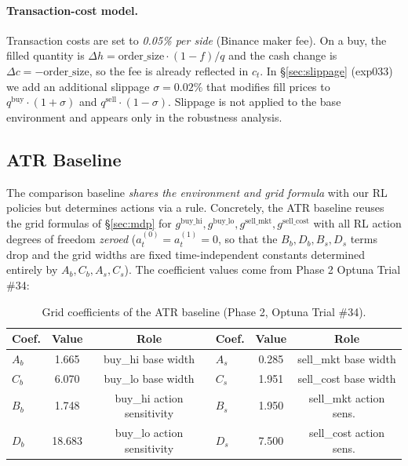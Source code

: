 \documentclass[11pt, a4paper]{article}
\begin{document}
\paragraph{Transaction-cost model.}
Transaction costs are set to \emph{0.05\% per side} (Binance maker fee). On a
buy, the filled quantity is $\Delta h = \text{order\_size} \cdot (1 - f) / q$
and the cash change is $\Delta c = -\text{order\_size}$, so the fee is already
reflected in $c_t$. In \S\ref{sec:slippage} (exp033) we add an additional
slippage $\sigma = 0.02\%$ that modifies fill prices to
$q^{\mathrm{buy}} \cdot (1 + \sigma)$ and $q^{\mathrm{sell}} \cdot (1 - \sigma)$.
Slippage is not applied to the base environment and appears only in the
robustness analysis.

\subsection{ATR Baseline}
\label{sec:atr_baseline}

The comparison baseline \emph{shares the environment and grid formula} with
our RL policies but determines actions via a rule. Concretely, the ATR
baseline reuses the grid formulas of \S\ref{sec:mdp} for $g^{\mathrm{buy\_hi}},
g^{\mathrm{buy\_lo}}, g^{\mathrm{sell\_mkt}}, g^{\mathrm{sell\_cost}}$ with all
RL action degrees of freedom \emph{zeroed} ($a_t^{(0)} = a_t^{(1)} = 0$, so
that the $B_b, D_b, B_s, D_s$ terms drop and the grid widths are fixed
time-independent constants determined entirely by $A_b, C_b, A_s, C_s$). The
coefficient values come from Phase 2 Optuna Trial \#34:

\begin{table}[!htbp]
\centering
\caption{Grid coefficients of the ATR baseline (Phase 2, Optuna Trial \#34).}
\begin{tabular}{lcclcc}
\toprule
Coef. & Value & Role & Coef. & Value & Role \\
\midrule
$A_b$ & 1.665 & buy\_hi base width & $A_s$ & 0.285 & sell\_mkt base width \\
$C_b$ & 6.070 & buy\_lo base width & $C_s$ & 1.951 & sell\_cost base width \\
$B_b$ & 1.748 & buy\_hi action sensitivity & $B_s$ & 1.950 & sell\_mkt action sens.\ \\
$D_b$ & 18.683 & buy\_lo action sensitivity & $D_s$ & 7.500 & sell\_cost action sens.\ \\
\bottomrule
\end{tabular}
\label{tab:atr_coefs}
\end{table}
\end{document}

